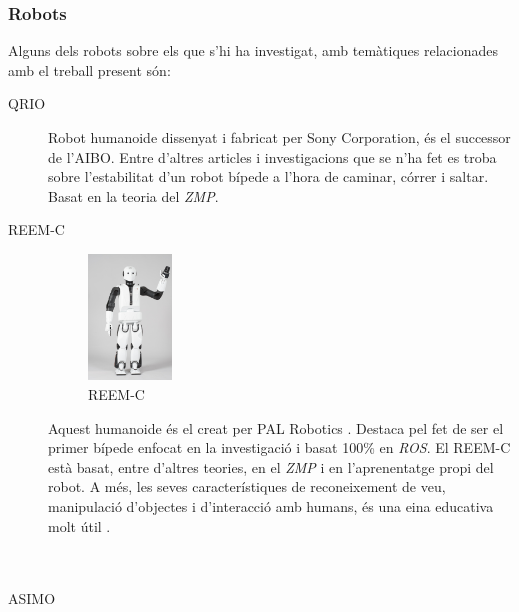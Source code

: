 \documentclass[12pt,a4paper,final,twoside]{article}
\begin{document}
\subsubsection{Robots}
\label{Robots}

Alguns dels robots sobre els que s'hi ha investigat, amb temàtiques relacionades amb el treball present són:
\begin{description}
\item[QRIO]
\begin{minipage}[t]{0.94\linewidth}
Robot humanoide dissenyat i fabricat per Sony Corporation, és el successor de l'AIBO. Entre d'altres articles i investigacions que se n'ha fet es troba \cite{Nagasaka2004} sobre l'estabilitat d'un robot bípede a l'hora de caminar, córrer i saltar. Basat en la teoria del \textit{ZMP}.
\end{minipage}

\item[REEM-C]
\begin{minipage}[t]{0.94\linewidth}
	\begin{figure}
	    \centering
		\includegraphics[width=0.22\textwidth]{Imatges/REEM-C}
                \caption{REEM-C \cite{REEM_C}}
     \end{figure}
Aquest humanoide és el creat per PAL Robotics \cite{REEM_C}. Destaca pel fet de ser el primer bípede enfocat en la investigació i basat 100\% en \textit{ROS}. El REEM-C està basat, entre d'altres teories, en el \textit{ZMP} i en l'aprenentatge propi del robot. A més, les seves característiques de reconeixement de veu, manipulació d'objectes i d'interacció amb humans, és una eina educativa molt útil \cite{REEM_C}.
\end{minipage}

\paragraph{}$ $%

\item[ASIMO]
\begin{minipage}[t]{0.94\linewidth}


\end{minipage}
\end{description}
\end{document}
